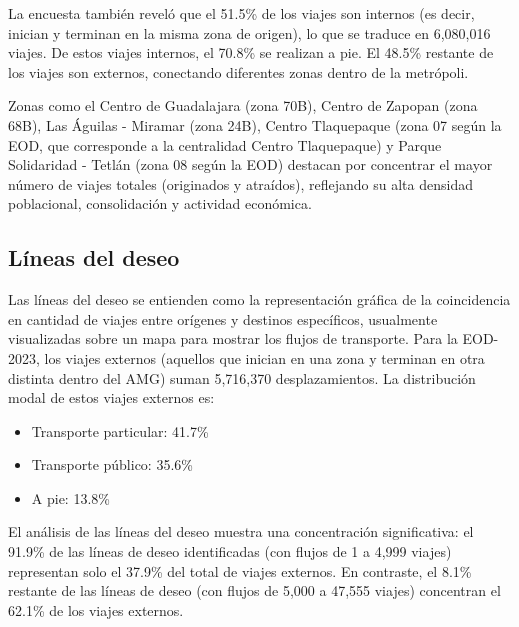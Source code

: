 \documentclass[openany]{book}
\begin{document}
            La encuesta también reveló que el 51.5\% de los viajes son internos (es decir, inician y terminan en la misma zona de origen), lo que se traduce en 6,080,016 viajes. De estos viajes internos, el 70.8\% se realizan a pie. El 48.5\% restante de los viajes son externos, conectando diferentes zonas dentro de la metrópoli.

            Zonas como el Centro de Guadalajara (zona 70B), Centro de Zapopan (zona 68B), Las Águilas - Miramar (zona 24B), Centro Tlaquepaque (zona 07 según la EOD, que corresponde a la centralidad Centro Tlaquepaque) y Parque Solidaridad - Tetlán (zona 08 según la EOD) destacan por concentrar el mayor número de viajes totales (originados y atraídos), reflejando su alta densidad poblacional, consolidación y actividad económica.

            \subsection{Líneas del deseo}
            Las líneas del deseo se entienden como la representación gráfica de la coincidencia en cantidad de viajes entre orígenes y destinos específicos, usualmente visualizadas sobre un mapa para mostrar los flujos de transporte. Para la EOD-2023, los viajes externos (aquellos que inician en una zona y terminan en otra distinta dentro del AMG) suman 5,716,370 desplazamientos. La distribución modal de estos viajes externos es:
            \begin{itemize}
                \item Transporte particular: 41.7\%
                \item Transporte público: 35.6\%
                \item A pie: 13.8\%
            \end{itemize}
            El análisis de las líneas del deseo muestra una concentración significativa: el 91.9\% de las líneas de deseo identificadas (con flujos de 1 a 4,999 viajes) representan solo el 37.9\% del total de viajes externos. En contraste, el 8.1\% restante de las líneas de deseo (con flujos de 5,000 a 47,555 viajes) concentran el 62.1\% de los viajes externos.
\end{document}
